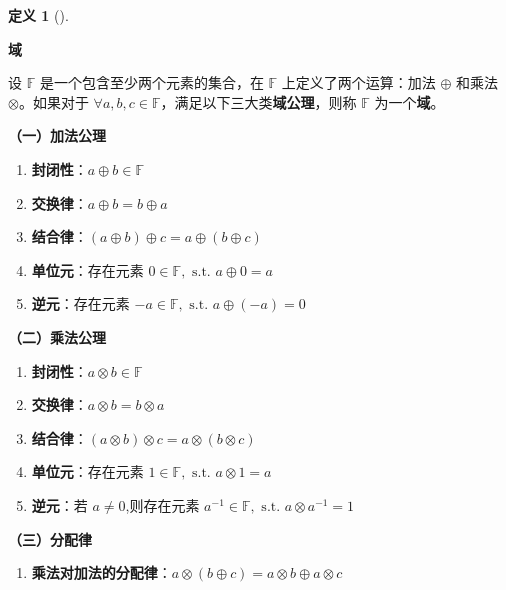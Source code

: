 \documentclass[
  chinese-hans,
]{ctexart}
\providecommand{\tightlist}{%
  \setlength{\itemsep}{0pt}\setlength{\parskip}{0pt}}
\theoremstyle{definition}
\newtheorem{definition}{定义}[section]
\theoremstyle{remark}
\begin{document}
\begin{definition}[]\protect\hypertarget{def-field}{}\label{def-field}

\textbf{域}

设 \(\mathbb{F}\) 是一个包含至少两个元素的集合，在 \(\mathbb{F}\)
上定义了两个运算：加法 \(\oplus\) 和乘法 \(\otimes\)。如果对于
\(\forall a,b,c \in \mathbb{F}\)，满足以下三大类\textbf{域公理}，则称
\(\mathbb{F}\) 为一个\textbf{域}。

\textbf{（一）加法公理}

\begin{enumerate}
\def\labelenumi{\arabic{enumi}.}
\tightlist
\item
  \textbf{封闭性}：\(a \oplus b \in \mathbb{F}\)
\item
  \textbf{交换律}：\(a \oplus b = b \oplus a\)
\item
  \textbf{结合律}：\((a \oplus b)\oplus c = a \oplus(b \oplus c)\)
\item
  \textbf{单位元}：存在元素
  \(0 \in \mathbb{F},\text{ s.t. }a \oplus 0 = a\)
\item
  \textbf{逆元}：存在元素
  \(-a \in \mathbb{F},\text{ s.t. }a \oplus (-a) = 0\)
\end{enumerate}

\textbf{（二）乘法公理}

\begin{enumerate}
\def\labelenumi{\arabic{enumi}.}
\setcounter{enumi}{5}
\tightlist
\item
  \textbf{封闭性}：\(a \otimes b \in \mathbb{F}\)
\item
  \textbf{交换律}：\(a \otimes b = b \otimes a\)
\item
  \textbf{结合律}：\((a \otimes b) \otimes c = a \otimes(b \otimes c)\)
\item
  \textbf{单位元}：存在元素
  \(1 \in \mathbb{F},\text{ s.t. }a \otimes 1 = a\)
\item
  \textbf{逆元}：若 \(a \neq 0\),则存在元素
  \(a^{-1} \in \mathbb{F},\text{ s.t. }a \otimes a^{-1} = 1\)
\end{enumerate}

\textbf{（三）分配律}

\begin{enumerate}
\def\labelenumi{\arabic{enumi}.}
\setcounter{enumi}{10}
\tightlist
\item
  \textbf{乘法对加法的分配律}：\(a \otimes (b \oplus c)= a \otimes b \oplus a \otimes c\)
\end{enumerate}

\end{definition}
\end{document}
